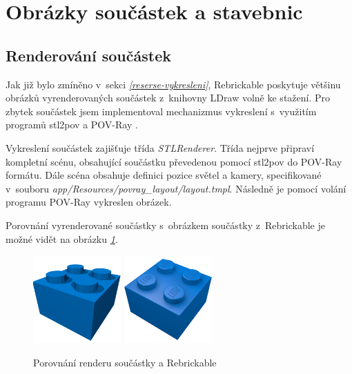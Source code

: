 \section{Obrázky součástek a stavebnic}
\subsection{Renderování součástek}
Jak již bylo zmíněno v~sekci \emph{\ref{reserse-vykresleni}}, Rebrickable poskytuje většinu obrázků vyrenderovaných součástek z~knihovny LDraw volně ke stažení. Pro zbytek součástek jsem implementoval mechanizmus vykreslení s~využitím programů stl2pov \autocite{stl2pov} a POV-Ray \autocite{povray}.

Vykreslení součástek zajišťuje třída \textit{STLRenderer}. Třída nejprve připraví kompletní scénu, obsahující součástku převedenou pomocí stl2pov do POV-Ray formátu. Dále scéna obsahuje definici pozice světel a kamery, specifikované v~souboru \textit{app/Resources/povray\_layout/layout.tmpl}. Následně je pomocí volání programu POV-Ray vykreslen obrázek. 

Porovnání vyrenderované součástky s~obrázkem součástky z~Rebrickable je možné vidět na obrázku \emph{\ref{porovnani-render}}.

\begin{figure}[htbp]
    \centering
    \includegraphics[width=0.30\textwidth,height=\textheight,keepaspectratio]{images/povray.png}
    \includegraphics[width=0.30\textwidth,height=\textheight,keepaspectratio]{images/3003.png}
    \caption{Porovnání renderu součástky a Rebrickable \autocite{rebrickable:part:image:3003}\label{porovnani-render}}
\end{figure}


